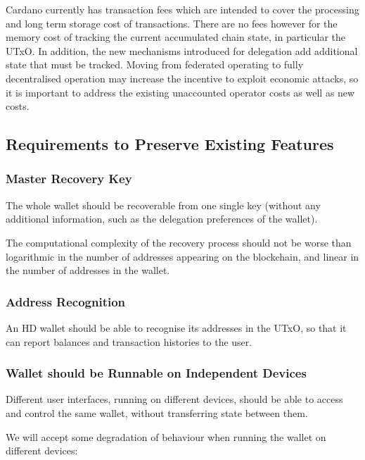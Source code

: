 \documentclass[11pt,a4paper]{article}
\begin{document}
Cardano currently has transaction fees which are intended to cover the
processing and long term storage cost of transactions. There are no fees
however for the memory cost of tracking the current accumulated chain
state, in particular the UTxO. In addition, the new mechanisms
introduced for delegation add additional state that must be tracked.
Moving from federated operating to fully decentralised operation may
increase the incentive to exploit economic attacks, so it is important
to address the existing unaccounted operator costs as well as new costs.

\subsection{Requirements to Preserve Existing Features}
\label{requirements-to-preserve-existing-features}

\subsubsection{Master Recovery Key}
\label{master-recovery-key}

The whole wallet should be recoverable from one single key (without any
additional information, such as the delegation preferences of the
wallet).

The computational complexity of the recovery process should not be worse
than logarithmic in the number of addresses appearing on the blockchain,
and linear in the number of addresses in the wallet.

\subsubsection{Address Recognition}
\label{address-recognition}

An HD wallet should be able to recognise its addresses in the UTxO, so
that it can report balances and transaction histories to the user.

\subsubsection{Wallet should be Runnable on Independent Devices}
\label{wallet-should-be-runnable-on-independent-devices}

Different user interfaces, running on different devices, should be able
to access and control the same wallet, without transferring state
between them.

We will accept some degradation of behaviour when running the wallet on
different devices:
\end{document}
